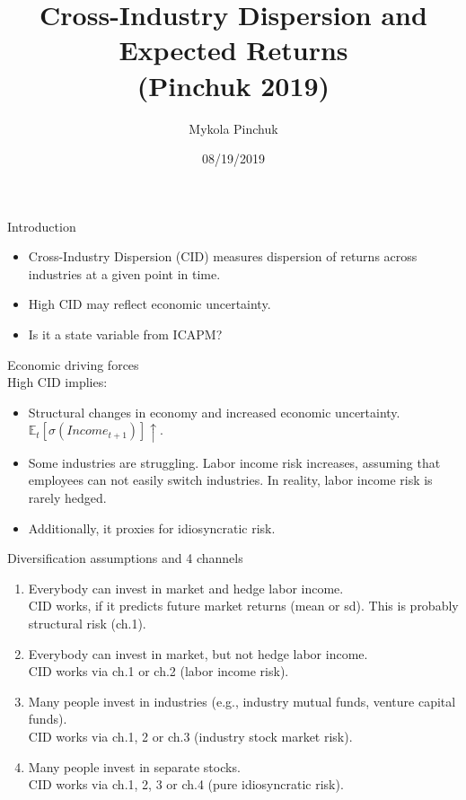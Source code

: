 \documentclass{beamer}
\title{Cross-Industry Dispersion and Expected Returns \\ (Pinchuk 2019)}
\author{Mykola Pinchuk}
\date{08/19/2019}
\begin{document}
\begin{frame}
  \titlepage
\end{frame}


\begin{frame}{Introduction}
\begin{itemize}
    \item {Cross-Industry Dispersion (CID) measures dispersion of returns across industries at a given point in time.}
    \item {High CID may reflect economic uncertainty.}
    \item {Is it a state variable from ICAPM?}
\end{itemize}
\end{frame}


\begin{frame}{Economic driving forces}\\
{High CID implies:}
\vspace{1cm}
\begin{itemize}
    \item {Structural changes in economy and increased economic uncertainty. $\mathbb{E}_t[\sigma(Income_{t+1})]\uparrow$.}
    \item {Some industries are struggling. Labor income risk increases, assuming that employees can not easily switch industries. In reality, labor income risk is rarely hedged.}
    \item {Additionally, it proxies for idiosyncratic risk.}
\end{itemize}
\end{frame}


\begin{frame}{Diversification assumptions and 4 channels}
\begin{enumerate}
    \item {Everybody can invest in market and hedge labor income. \\
    CID works, if it predicts future market returns (mean or sd). This is probably structural risk (ch.1).}
    \item {Everybody can invest in market, but not hedge labor income. \\
    CID works via ch.1 or ch.2 (labor income risk).}
    \item {Many people invest in industries (e.g., industry mutual funds, venture capital funds). \\
    CID works via ch.1, 2 or ch.3 (industry stock market risk).}
    \item {Many people invest in separate stocks. \\
    CID works via ch.1, 2, 3 or ch.4 (pure idiosyncratic risk).}
\end{enumerate}
\end{frame}
\end{document}
